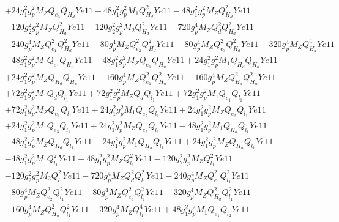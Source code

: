  \begin{align} 
 & +24 g_{1}^{2} g_{p}^{2} M_Z Q_{e_3} Q_{H_d} Ye11 -48 g_{1}^{2} g_{p}^{2} M_1 Q_{H_d}^{2} Ye11 -48 g_{1}^{2} g_{p}^{2} M_Z Q_{H_d}^{2} Ye11 \nonumber \\ 
 &-120 g_{2}^{2} g_{p}^{2} M_Z Q_{H_d}^{2} Ye11 -120 g_{2}^{2} g_{p}^{2} M_2 Q_{H_d}^{2} Ye11 -720 g_{p}^{4} M_Z Q_{d}^{2} Q_{H_d}^{2} Ye11 \nonumber \\ 
 &-240 g_{p}^{4} M_Z Q_{e_{1}}^{2} Q_{H_d}^{2} Ye11 -80 g_{p}^{4} M_Z Q_{e_{2}}^{2} Q_{H_d}^{2} Ye11 -80 g_{p}^{4} M_Z Q_{e_3}^{2} Q_{H_d}^{2} Ye11 -320 g_{p}^{4} M_Z Q_{H_d}^{4} Ye11 \nonumber \\ 
 &-48 g_{1}^{2} g_{p}^{2} M_1 Q_{e_{1}} Q_{H_u} Ye11 -48 g_{1}^{2} g_{p}^{2} M_Z Q_{e_{1}} Q_{H_u} Ye11 +24 g_{1}^{2} g_{p}^{2} M_1 Q_{H_d} Q_{H_u} Ye11 \nonumber \\ 
 &+24 g_{1}^{2} g_{p}^{2} M_Z Q_{H_d} Q_{H_u} Ye11 -160 g_{p}^{4} M_Z Q_{e_{1}}^{2} Q_{H_u}^{2} Ye11 -160 g_{p}^{4} M_Z Q_{H_d}^{2} Q_{H_u}^{2} Ye11 \nonumber \\ 
 &+72 g_{1}^{2} g_{p}^{2} M_1 Q_{d} Q_{l_1} Ye11 +72 g_{1}^{2} g_{p}^{2} M_Z Q_{d} Q_{l_1} Ye11 +72 g_{1}^{2} g_{p}^{2} M_1 Q_{e_{1}} Q_{l_1} Ye11 \nonumber \\ 
 &+72 g_{1}^{2} g_{p}^{2} M_Z Q_{e_{1}} Q_{l_1} Ye11 +24 g_{1}^{2} g_{p}^{2} M_1 Q_{e_{2}} Q_{l_1} Ye11 +24 g_{1}^{2} g_{p}^{2} M_Z Q_{e_{2}} Q_{l_1} Ye11 \nonumber \\ 
 &+24 g_{1}^{2} g_{p}^{2} M_1 Q_{e_3} Q_{l_1} Ye11 +24 g_{1}^{2} g_{p}^{2} M_Z Q_{e_3} Q_{l_1} Ye11 -48 g_{1}^{2} g_{p}^{2} M_1 Q_{H_d} Q_{l_1} Ye11 \nonumber \\ 
 &-48 g_{1}^{2} g_{p}^{2} M_Z Q_{H_d} Q_{l_1} Ye11 +24 g_{1}^{2} g_{p}^{2} M_1 Q_{H_u} Q_{l_1} Ye11 +24 g_{1}^{2} g_{p}^{2} M_Z Q_{H_u} Q_{l_1} Ye11 \nonumber \\ 
 &-48 g_{1}^{2} g_{p}^{2} M_1 Q_{l_1}^{2} Ye11 -48 g_{1}^{2} g_{p}^{2} M_Z Q_{l_1}^{2} Ye11 -120 g_{2}^{2} g_{p}^{2} M_Z Q_{l_1}^{2} Ye11 \nonumber \\ 
 &-120 g_{2}^{2} g_{p}^{2} M_2 Q_{l_1}^{2} Ye11 -720 g_{p}^{4} M_Z Q_{d}^{2} Q_{l_1}^{2} Ye11 -240 g_{p}^{4} M_Z Q_{e_{1}}^{2} Q_{l_1}^{2} Ye11 \nonumber \\ 
 &-80 g_{p}^{4} M_Z Q_{e_{2}}^{2} Q_{l_1}^{2} Ye11 -80 g_{p}^{4} M_Z Q_{e_3}^{2} Q_{l_1}^{2} Ye11 -320 g_{p}^{4} M_Z Q_{H_d}^{2} Q_{l_1}^{2} Ye11 \nonumber \\ 
 &-160 g_{p}^{4} M_Z Q_{H_u}^{2} Q_{l_1}^{2} Ye11 -320 g_{p}^{4} M_Z Q_{l_1}^{4} Ye11 +48 g_{1}^{2} g_{p}^{2} M_1 Q_{e_{1}} Q_{l_2} Ye11 \nonumber \\ 

\end{align}
